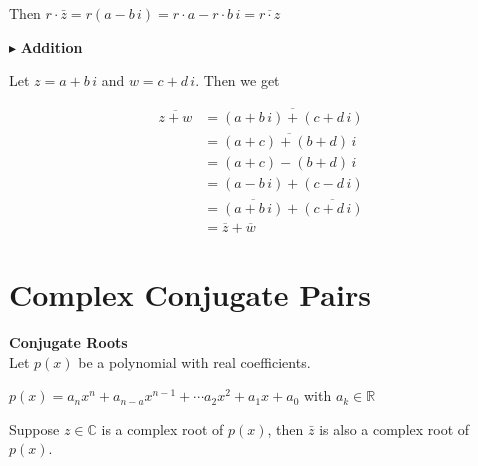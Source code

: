 \documentclass{ximera}
\begin{document}
Then $r \cdot \bar{z} = r(a - b \, i) = r \cdot a - r \cdot b \, i = \overline{r \cdot z}$







$\blacktriangleright$ \textbf{Addition}


Let $z = a + b \, i$ and $w = c + d \, i$.  Then we get


\begin{align*}
\overline{z + w} & = \overline{(a + b \, i) + (c + d \, i)}  \\
                & = \overline{(a + c) + (b + d) \, i}   \\
                & = (a + c) - (b + d) \, i  \\
                & = (a - b \, i) + (c - d \, i)   \\
                & = \overline{(a + b \, i)} + \overline{(c + d \, i)}  \\
                & = \overline{z} + \overline{w}
\end{align*}























\section{Complex Conjugate Pairs}




\begin{theorem} \textbf{\textcolor{blue!55!black}{Conjugate Roots}}   \\



Let $p(x)$ be a polynomial with real coefficients.

$p(x) = a_n x^n + a_{n-a} x^{n-1} + \cdots a_2 x^2 + a_1 x + a_0$   with $a_k \in \mathbb{R}$

Suppose $z \in \mathbb{C}$ is a complex root of $p(x)$, then $\bar{z}$ is also a complex root of $p(x)$.


\end{theorem}
\end{document}
